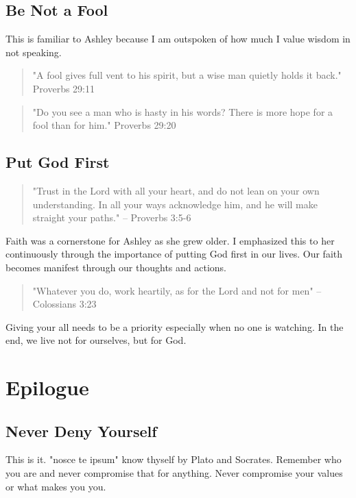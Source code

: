 \documentclass[11pt,a4paper,sans]{article}
\begin{document}
\subsection{Be Not a Fool}

This is familiar to Ashley because I am outspoken of how much I value wisdom
in not speaking. 
\begin{quote}
    "A fool gives full vent to his spirit,
but a wise man quietly holds it back." Proverbs 29:11
\end{quote}

\begin{quote}
    "Do you see a man who is hasty in his words?
There is more hope for a fool than for him." Proverbs 29:20
\end{quote}

\subsection{Put God First}
\begin{quote}
    "Trust in the Lord with all your heart, and do not lean on 
your own understanding. In all your ways acknowledge him, and 
he will make straight your paths." -- Proverbs 3:5-6
\end{quote}

Faith was a cornerstone for Ashley as she grew older. I emphasized this
to her continuously through the importance of putting God first in our lives.
Our faith becomes manifest through our thoughts and actions.

\begin{quote}
    "Whatever you do, work heartily, as for the Lord and not for men" -- Colossians 3:23
\end{quote}

Giving your all needs to be a priority especially when no one is watching. In the 
end, we live not for ourselves, but for God.


\section{Epilogue}

\subsection{Never Deny Yourself}
This is it. "nosce te ipsum" know thyself by Plato and Socrates. Remember who you
are and never compromise that for anything. Never compromise your values or what makes
you you.
\end{document}
